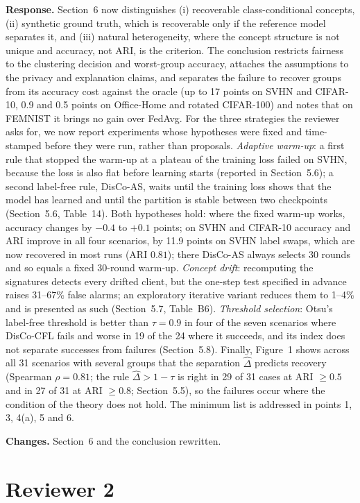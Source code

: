 \documentclass[11pt]{article}
\newcommand{\resp}{\par\noindent\textbf{Response.} }
\newcommand{\chg}{\par\noindent\textbf{Changes.} }
\begin{document}
\resp Section~6 now distinguishes (i) recoverable class-conditional concepts, (ii) synthetic ground truth, which is recoverable only if the reference model separates it, and (iii) natural heterogeneity, where the concept structure is not unique and accuracy, not ARI, is the criterion. The conclusion restricts fairness to the clustering decision and worst-group accuracy, attaches the assumptions to the privacy and explanation claims, and separates the failure to recover groups from its accuracy cost against the oracle (up to 17 points on SVHN and CIFAR-10, 0.9 and 0.5 points on Office-Home and rotated CIFAR-100) and notes that on FEMNIST it brings no gain over FedAvg. For the three strategies the reviewer asks for, we now report experiments whose hypotheses were fixed and time-stamped before they were run, rather than proposals. \emph{Adaptive warm-up}: a first rule that stopped the warm-up at a plateau of the training loss failed on SVHN, because the loss is also flat before learning starts (reported in Section~5.6); a second label-free rule, DisCo-AS, waits until the training loss shows that the model has learned and until the partition is stable between two checkpoints (Section~5.6, Table~14). Both hypotheses hold: where the fixed warm-up works, accuracy changes by $-0.4$ to $+0.1$ points; on SVHN and CIFAR-10 accuracy and ARI improve in all four scenarios, by 11.9 points on SVHN label swaps, which are now recovered in most runs (ARI $0.81$); there DisCo-AS always selects 30 rounds and so equals a fixed 30-round warm-up. \emph{Concept drift}: recomputing the signatures detects every drifted client, but the one-step test specified in advance raises 31--67\% false alarms; an exploratory iterative variant reduces them to 1--4\% and is presented as such (Section~5.7, Table~B6). \emph{Threshold selection}: Otsu's label-free threshold is better than $\tau=0.9$ in four of the seven scenarios where DisCo-CFL fails and worse in 19 of the 24 where it succeeds, and its index does not separate successes from failures (Section~5.8). Finally, Figure~1 shows across all 31 scenarios with several groups that the separation $\hat\Delta$ predicts recovery (Spearman $\rho=0.81$; the rule $\hat\Delta>1-\tau$ is right in 29 of 31 cases at ARI $\ge0.5$ and in 27 of 31 at ARI $\ge0.8$; Section~5.5), so the failures occur where the condition of the theory does not hold. The minimum list is addressed in points 1, 3, 4(a), 5 and 6.
\chg Section~6 and the conclusion rewritten.

\section*{Reviewer 2}
\end{document}
